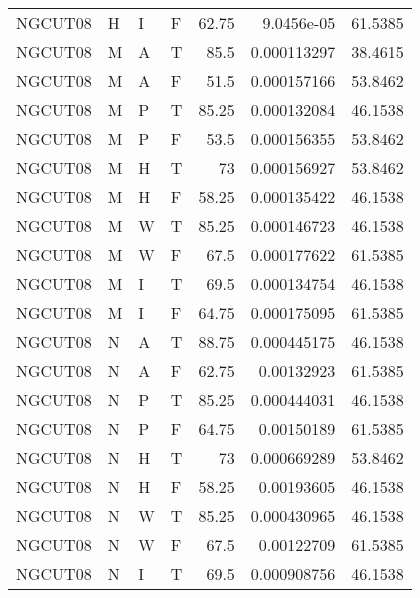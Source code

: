 \begin{longtable}{llllrrr}
    NGCUT08  & H         & I         & F          & 62.75      & 9.0456e-05  & 61.5385  \\
    NGCUT08  & M         & A         & T          & 85.5       & 0.000113297 & 38.4615  \\
    NGCUT08  & M         & A         & F          & 51.5       & 0.000157166 & 53.8462  \\
    NGCUT08  & M         & P         & T          & 85.25      & 0.000132084 & 46.1538  \\
    NGCUT08  & M         & P         & F          & 53.5       & 0.000156355 & 53.8462  \\
    NGCUT08  & M         & H         & T          & 73         & 0.000156927 & 53.8462  \\
    NGCUT08  & M         & H         & F          & 58.25      & 0.000135422 & 46.1538  \\
    NGCUT08  & M         & W         & T          & 85.25      & 0.000146723 & 46.1538  \\
    NGCUT08  & M         & W         & F          & 67.5       & 0.000177622 & 61.5385  \\
    NGCUT08  & M         & I         & T          & 69.5       & 0.000134754 & 46.1538  \\
    NGCUT08  & M         & I         & F          & 64.75      & 0.000175095 & 61.5385  \\
    NGCUT08  & N         & A         & T          & 88.75      & 0.000445175 & 46.1538  \\
    NGCUT08  & N         & A         & F          & 62.75      & 0.00132923  & 61.5385  \\
    NGCUT08  & N         & P         & T          & 85.25      & 0.000444031 & 46.1538  \\
    NGCUT08  & N         & P         & F          & 64.75      & 0.00150189  & 61.5385  \\
    NGCUT08  & N         & H         & T          & 73         & 0.000669289 & 53.8462  \\
    NGCUT08  & N         & H         & F          & 58.25      & 0.00193605  & 46.1538  \\
    NGCUT08  & N         & W         & T          & 85.25      & 0.000430965 & 46.1538  \\
    NGCUT08  & N         & W         & F          & 67.5       & 0.00122709  & 61.5385  \\
    NGCUT08  & N         & I         & T          & 69.5       & 0.000908756 & 46.1538  \\

\end{longtable}
